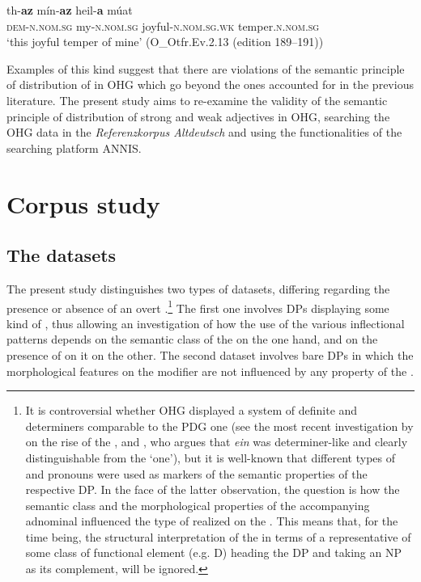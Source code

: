 \documentclass[output=paper,colorlinks,citecolor=brown]{langscibook}
\begin{document}
\begin{exe}
\ex\label{ch6ex19}
\gll th-\textbf{az} mín-\textbf{az} heil-\textbf{a} múat\\
 \textsc{dem-n.nom.sg} my-\textsc{n.nom.sg} joyful-\textsc{n.nom.sg.wk} temper.\textsc{n.nom.sg}\\
\glt  `this joyful temper of mine' (O\_Otfr.Ev.2.13 (edition 189--191))
\end{exe}

Examples of this kind suggest that there are violations of the semantic
principle of distribution of  in OHG which go
beyond the ones accounted for in the previous literature. The present
 study aims to re-examine the validity of the semantic principle
of distribution of strong and weak adjectives in OHG, searching the OHG
data in the \emph{Referenzkorpus Altdeutsch} and using the
functionalities of the searching platform ANNIS.





\section{Corpus study}\label{sec:corp}

\subsection{The datasets}\label{sec:dataset}
The present study distinguishes two types of datasets, differing
regarding the presence or absence of an overt .\footnote{It is
  controversial whether OHG displayed a system of definite and
   determiners comparable to the PDG one (see the most recent
  investigation by \cite{Flick2020} on the rise of the , and \cite{Petrova2015}, who argues that \textit{ein} was determiner-like and clearly distinguishable from the  `one'),
  but it is well-known that different types of  and
   pronouns were used as markers of the semantic properties of
  the respective DP. In the face of the latter observation, the question
  is how the semantic class and the morphological properties of the
  accompanying adnominal  influenced the type of 
  realized on the . This means that, for the time being, the
  structural interpretation of the  in terms of a representative
  of some class of functional element (e.g. D) heading the DP and
  taking an NP as its complement, will be ignored.} The first one
involves DPs displaying some kind of , thus allowing an investigation of how the use of the various inflectional patterns depends on
the semantic class of the  on the one hand, and on the
presence of  on it on the other. The second dataset involves
bare DPs in which the morphological features on the modifier are not
influenced by any property of the .
\end{document}
